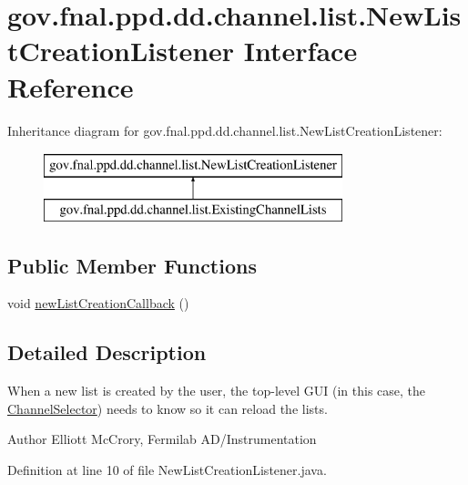 \hypertarget{interfacegov_1_1fnal_1_1ppd_1_1dd_1_1channel_1_1list_1_1NewListCreationListener}{\section{gov.\-fnal.\-ppd.\-dd.\-channel.\-list.\-New\-List\-Creation\-Listener Interface Reference}
\label{interfacegov_1_1fnal_1_1ppd_1_1dd_1_1channel_1_1list_1_1NewListCreationListener}
}
Inheritance diagram for gov.\-fnal.\-ppd.\-dd.\-channel.\-list.\-New\-List\-Creation\-Listener\-:\begin{figure}[H]
\begin{center}
\leavevmode
\includegraphics[height=2.000000cm]{interfacegov_1_1fnal_1_1ppd_1_1dd_1_1channel_1_1list_1_1NewListCreationListener}
\end{center}
\end{figure}
\subsection*{Public Member Functions}
\begin{DoxyCompactItemize}
\item 
void \hyperlink{interfacegov_1_1fnal_1_1ppd_1_1dd_1_1channel_1_1list_1_1NewListCreationListener_a453407f350d9eacded942c7336dd97c5}{new\-List\-Creation\-Callback} ()
\end{DoxyCompactItemize}


\subsection{Detailed Description}
When a new list is created by the user, the top-\/level G\-U\-I (in this case, the \hyperlink{classgov_1_1fnal_1_1ppd_1_1dd_1_1ChannelSelector}{Channel\-Selector}) needs to know so it can reload the lists.

\begin{DoxyAuthor}{Author}
Elliott Mc\-Crory, Fermilab A\-D/\-Instrumentation 
\end{DoxyAuthor}


Definition at line 10 of file New\-List\-Creation\-Listener.\-java.



